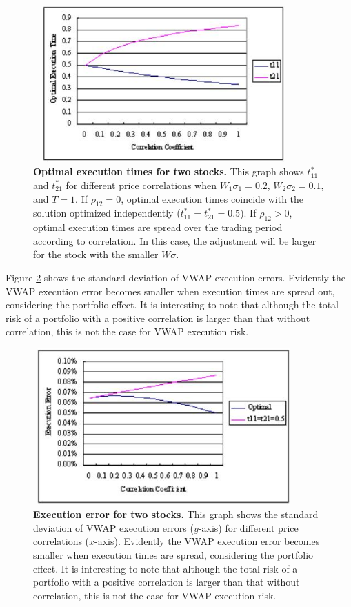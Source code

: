 \begin{figure}[htbp]
\bigskip
\begin{center}
 \includegraphics[width=10cm,height=6cm]{fg_s5n.png}
\end{center}
\caption[Optimal execution times for two stocks]{{\bf Optimal execution times for two stocks.}
 \quad This graph shows $t_{11}^*$ and $t_{21}^*$ for different price correlations when $W_1\sigma_1=0.2$,
 $W_2\sigma_2=0.1$,
and $T=1$.
 If $\rho_{12}=0$, optimal execution times coincide with the solution optimized independently
 ($t_{11}^*=t_{21}^*=0.5$).
 If $\rho_{12}>0$, optimal execution times are spread over the trading period according to correlation.
 In this case, the adjustment will be larger for the stock with the smaller $W\sigma$.}\label{fg_s5}
\end{figure}


Figure \ref{fg_s6} shows the standard deviation of VWAP execution errors.  Evidently the VWAP execution error becomes smaller when execution times are spread out, considering the portfolio effect.  It is interesting to note that although the total risk of a portfolio with a positive correlation is larger than that without correlation, this is not the case for VWAP execution risk.

\begin{figure}[htbp]
\begin{center}
 \includegraphics[width=10cm,height=6cm]{fg_s6n.png}
\end{center}
\caption[Execution error for two stocks]{{\bf Execution error for two stocks.}
 \quad This graph shows the standard deviation of VWAP execution errors ($y$-axis) for different price correlations
($x$-axis).
 Evidently the VWAP execution error becomes smaller when execution times are spread, considering the portfolio
effect.
 It is interesting to note that although the total risk of a portfolio with a positive correlation is larger
than that without correlation, this is not the case for VWAP execution risk.}\label{fg_s6}
\end{figure}


